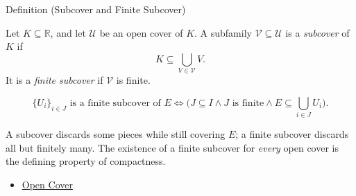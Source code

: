\begin{definitionbox}{Definition (Subcover and Finite Subcover)}
\begin{definition}
\label{def:finite-subcover}
Let $K\subseteq\mathbb{R}$, and let $\mathcal{U}$ be an open cover of $K$.
A subfamily $\mathcal{V}\subseteq\mathcal{U}$ is a \emph{subcover} of $K$ if
\[
  K\subseteq\bigcup_{V\in\mathcal{V}}V.
\]
It is a \emph{finite subcover} if $\mathcal{V}$ is finite.
\end{definition}
\end{definitionbox}
\begin{remark*}
\[
\{U_i\}_{i\in J} \text{ is a finite subcover of } E
\Longleftrightarrow
\bigl(J\subseteq I \land J \text{ is finite} \land E\subseteq\textstyle\bigcup_{i\in J}U_i\bigr).
\]
\end{remark*}
\begin{remark*}[Interpretation]
A subcover discards some pieces while still covering $E$; a finite subcover discards all but finitely many. The existence of a finite subcover for \emph{every} open cover is the defining property of compactness.
\end{remark*}
\begin{dependencies}
\begin{itemize}
  \item \hyperref[def:real-open-cover]{Open Cover}
\end{itemize}
\end{dependencies}
